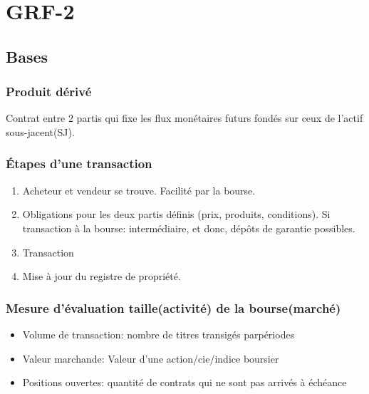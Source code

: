 \chapter{GRF-2}\label{grf-2}

\section{Bases}


\subsection*{Produit dérivé}\label{produit-derive}

Contrat entre 2 partis qui fixe les flux monétaires futurs fondés sur
ceux de l'actif sous-jacent(SJ).

\subsection*{Étapes d'une transaction}\label{etapes-dune-transaction}

\begin{enumerate}
\def\labelenumi{\arabic{enumi}.}

\item
  Acheteur et vendeur se trouve. Facilité par la bourse.
\item
  Obligations pour les deux partis définis (prix, produits, conditions).
  Si transaction à la bourse: intermédiaire, et donc, dépôts de garantie
  possibles.
\item
  Transaction
\item
  Mise à jour du registre de propriété.
\end{enumerate}

\subsection*{Mesure d'évaluation taille(activité) de la bourse(marché)}\label{mesure-devaluation-tailleactivite-de-la-boursemarche}

\begin{itemize}

\item
  Volume de transaction: nombre de titres transigés parpériodes
\item
  Valeur marchande: Valeur d'une action/cie/indice boursier
\item
  Positions ouvertes: quantité de contrats qui ne sont pas arrivés à
  échéance
\end{itemize}

